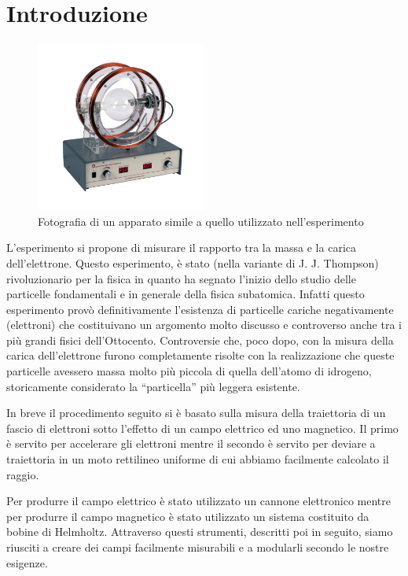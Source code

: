 \documentclass[a4paper,11pt]{article}
\newcommand{\virgolette}[1]{``#1''}
\begin{document}
	\section{Introduzione}
	\begin{figure}
		\centering
		\vspace{-0.5cm}
		\includegraphics[width=0.5\textwidth]{apparatus}
		
		\label{apparato}
		\caption{Fotografia di un apparato simile a quello utilizzato nell'esperimento}
	\end{figure}
	L'esperimento si propone di misurare il rapporto tra la massa e la carica dell'elettrone. Questo esperimento, è stato (nella variante di J. J. Thompson) rivoluzionario per la fisica in quanto ha segnato l'inizio dello studio delle particelle fondamentali e in generale della fisica subatomica. Infatti questo esperimento provò definitivamente l'esistenza di particelle cariche negativamente (elettroni) che costituivano un argomento molto discusso e controverso anche tra i più grandi fisici dell'Ottocento. Controversie che, poco dopo, con la misura della carica dell'elettrone furono completamente risolte con la realizzazione che queste particelle avessero massa molto più piccola di quella dell'atomo di idrogeno, storicamente considerato la \virgolette{particella} più leggera esistente.
	
	In breve il procedimento seguito si è basato sulla misura della traiettoria di un fascio di elettroni sotto l'effetto di un campo elettrico ed uno magnetico. Il primo è servito per accelerare gli elettroni mentre il secondo è servito per deviare a traiettoria in un moto rettilineo uniforme di cui abbiamo facilmente calcolato il raggio.
	
	Per produrre il campo elettrico è stato utilizzato un cannone elettronico mentre per produrre il campo magnetico è stato utilizzato un sistema costituito da bobine di Helmholtz. Attraverso questi strumenti, descritti poi in seguito, siamo riusciti a creare dei campi facilmente misurabili e a modularli secondo le nostre esigenze.
	
\end{document}
